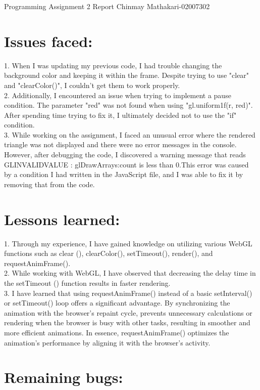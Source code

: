\documentclass[12pt]{report}
\begin{document}
\begin{center}
\huge{Programming Assignment 2 Report}
\large{Chinmay Mathakari-02007302}
\end{center}

\section{Issues faced:}
1.	When I was updating my previous code, I had trouble changing the background color and keeping it within the frame. Despite trying to use "clear" and "clearColor()", I couldn't get them to work properly.\\
2.	Additionally, I encountered an issue when trying to implement a pause condition. The parameter "red" was not found when using "gl.uniform1f(r, red)". After spending time trying to fix it, I ultimately decided not to use the "if" condition.\\
3.	While working on the assignment, I faced an unusual error where the rendered triangle was not displayed and there were no error messages in the console. However, after debugging the code, I discovered a warning message that reads GLINVALIDVALUE : glDrawArrays:count is less than 0.This error was caused by a condition I had written in the JavaScript file, and I was able to fix it by removing that from the code.

\section{Lessons learned: }
1.	Through my experience, I have gained knowledge on utilizing various WebGL functions such as clear (), clearColor(), setTimeout(), render(), and requestAnimFrame().\\
2.	While working with WebGL, I have observed that decreasing the delay time in the setTimeout () function results in faster rendering.\\
3.	I have learned that using requestAnimFrame() instead of a basic setInterval() or setTimeout() loop offers a significant advantage. By synchronizing the animation with the browser's repaint cycle, prevents unnecessary calculations or rendering when the browser is busy with other tasks, resulting in smoother and more efficient animations. In essence, requestAnimFrame() optimizes the animation's performance by aligning it with the browser's activity.

\section{Remaining bugs:} 
\end{document}
